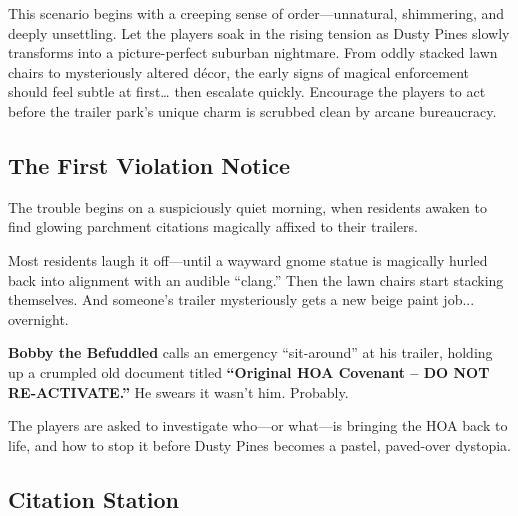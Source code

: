 This scenario begins with a creeping sense of order—unnatural, shimmering, and deeply unsettling. Let the players soak in the rising tension as Dusty Pines slowly transforms into a picture-perfect suburban nightmare. From oddly stacked lawn chairs to mysteriously altered décor, the early signs of magical enforcement should feel subtle at first… then escalate quickly. Encourage the players to act before the trailer park’s unique charm is scrubbed clean by arcane bureaucracy.


\subsection{The First Violation Notice}

The trouble begins on a suspiciously quiet morning, when residents awaken to find glowing parchment citations magically affixed to their trailers.

\begin{center}
\end{center}

Most residents laugh it off—until a wayward gnome statue is magically hurled back into alignment with an audible “clang.” Then the lawn chairs start stacking themselves. And someone’s trailer mysteriously gets a new beige paint job... overnight.

\textbf{Bobby the Befuddled} calls an emergency “sit-around” at his trailer, holding up a crumpled old document titled \textbf{“Original HOA Covenant – DO NOT RE-ACTIVATE.”} He swears it wasn’t him. Probably.

The players are asked to investigate who—or what—is bringing the HOA back to life, and how to stop it before Dusty Pines becomes a pastel, paved-over dystopia.

\subsection{Citation Station}

